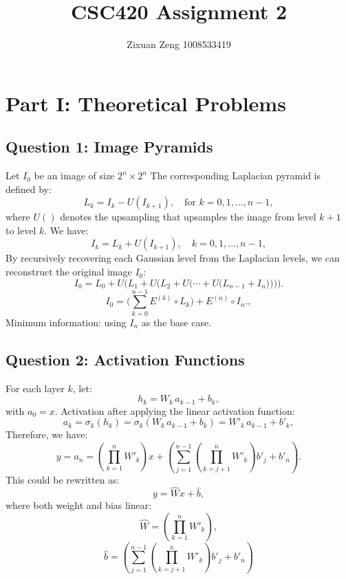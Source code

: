 \documentclass{article}
\title{CSC420 Assignment 2}
\author{Zixuan Zeng 1008533419}
\begin{document}
\date{}
\maketitle
\newpage



\section*{Part I: Theoretical Problems}
\subsection*{Question 1: Image Pyramids}
Let \(I_0\) be an image of size \(2^n \times 2^n\) \newline
The corresponding Laplacian pyramid is defined by:
\[
L_k = I_k - U(I_{k+1}), \quad \text{for } k = 0, 1, \dots, n-1,
\]
where \(U()\) denotes the upsampling 
that upsamples the image from level \(k+1\) to level \(k\).\newline
We have:
\[
I_k = L_k + U(I_{k+1}), \quad k = 0,1,\dots,n-1,
\]
By recursively recovering each Gaussian level from the Laplacian levels, 
we can reconstruct the original image \(I_0\):
\[
I_0 = L_0 + U\Big( L_1 + U\Big( L_2 + U\Big( \cdots + U\big( L_{n-1} + I_n \big)\Big) \Big) \Big).
\]
\[
I_0 = \Big(\sum_{k=0}^{n-1} E^{(k)}\circ L_k\Big) + E^{(n)}\circ I_n.,
\]
Minimum information: using \(I_n\) as the base case.\newline


\subsection*{Question 2: Activation Functions}
For each layer \(k\), let:
\[
h_k = W_k\,a_{k-1} + b_k,
\]
with \(a_0 = x\).\newline
Activation after applying the linear activation function:
\[
a_k = \sigma_k(h_k) = \sigma_k(W_k\,a_{k-1} + b_k) = W'_k\,a_{k-1} + b'_k,
\] 
Therefore, we have:
\[
y = a_n = \left( \prod_{k=1}^{n} W'_k \right)x + \left( \sum_{j=1}^{n-1} \left( \prod_{k=j+1}^{n} W'_k \right)b'_j + b'_n \right).
\]
This could be rewritten as:
\[
y = \hat{W}x + \hat{b},
\]
where both weight and bias linear:
\[
\hat{W} = \left( \prod_{k=1}^{n} W'_k \right),
\]
\[
\hat{b} = \left( \sum_{j=1}^{n-1} \left( \prod_{k=j+1}^{n} W'_k \right)b'_j + b'_n \right)
\]\newline
\end{document}
